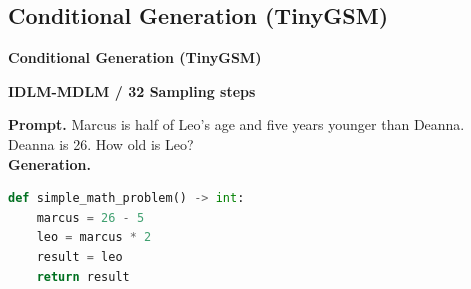 \subsection{Conditional Generation (TinyGSM)}
\label{app:tinygsm-qualitative-samples}

\begin{tcolorbox}[
    enhanced,
    breakable,
    colframe=tinyorange,
    colback=orange!3!white,
    boxrule=0.65pt,
    arc=4pt,
    left=5pt,
    right=5pt,
    top=3pt,
    bottom=3pt,
    width=\textwidth,
    before upper={\setlength{\parindent}{0pt}}]
\noindent
\begin{minipage}[c]{0.04\linewidth}
\centering
\qualdocicon
\end{minipage}%
\begin{minipage}[c]{0.94\linewidth}
{\normalsize\bfseries\textcolor{tinyorange}{Conditional Generation (TinyGSM)}}
\end{minipage}

\noindent
\begin{minipage}[t]{0.31\linewidth}
{\footnotesize\bfseries\textcolor{tinyorange}{IDLM-MDLM / 32 Sampling steps}}\\[-0.1mm]
\end{minipage}\hfill
\begin{minipage}[t]{0.66\linewidth}
{\scriptsize\bfseries Prompt.}
{\scriptsize Marcus is half of Leo's age and five years younger than Deanna. Deanna is 26. How old is Leo?}\\[-0.1mm]
{\scriptsize\bfseries Generation.}\\[-2.4mm]
\begin{lstlisting}[language=Python,basicstyle=\ttfamily\tiny,columns=fullflexible,keepspaces=true,breaklines=true,aboveskip=0pt,belowskip=0pt,xleftmargin=0.04\linewidth,xrightmargin=0.04\linewidth]
def simple_math_problem() -> int:
    marcus = 26 - 5
    leo = marcus * 2
    result = leo
    return result
\end{lstlisting}
\end{minipage}


\end{tcolorbox}
